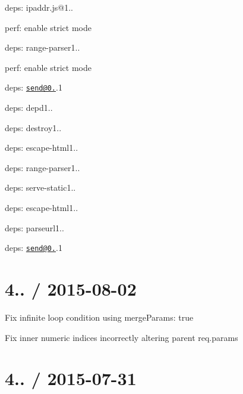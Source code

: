 \begin{DoxyItemize}
\begin{DoxyItemize}
\item deps\+: ipaddr.\+js@1..
\item perf\+: enable strict mode
\end{DoxyItemize}
\item deps\+: range-\/parser1..
\begin{DoxyItemize}
\item perf\+: enable strict mode
\end{DoxyItemize}
\item deps\+: \href{mailto:send@0.13}{\tt send@0.}.1
\begin{DoxyItemize}
\item deps\+: depd1..
\item deps\+: destroy1..
\item deps\+: escape-\/html1..
\item deps\+: range-\/parser1..
\end{DoxyItemize}
\item deps\+: serve-\/static1..
\begin{DoxyItemize}
\item deps\+: escape-\/html1..
\item deps\+: parseurl1..
\item deps\+: \href{mailto:send@0.13}{\tt send@0.}.1
\end{DoxyItemize}
\end{DoxyItemize}

\section*{4.. / 2015-\/08-\/02 }


\begin{DoxyItemize}
\item Fix infinite loop condition using {\ttfamily merge\+Params\+: true}
\item Fix inner numeric indices incorrectly altering parent {\ttfamily req.\+params}
\end{DoxyItemize}

\section*{4.. / 2015-\/07-\/31 }


